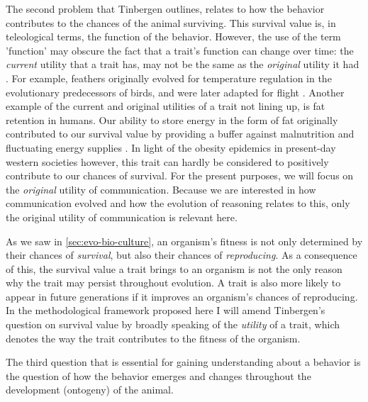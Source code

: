 The second problem that Tinbergen outlines, relates to how the behavior contributes to the chances of the animal surviving.
This survival value is, in teleological terms, the function of the behavior.  However, the use of the term 'function' may obscure the fact that a trait's function can change over time: the \emph{current} utility that a trait has, may not be the same as the \emph{original} utility it had \citep{BatesonLaland13}. For example, feathers originally evolved for temperature regulation in the evolutionary predecessors of birds, and were later adapted for flight \citep{Benton19, BatesonLaland13}.
Another example of the current and original utilities of a trait not lining up, is fat retention in humans. Our ability to store energy in the form of fat originally contributed to our survival value by providing a buffer against malnutrition and fluctuating energy supplies \citep{Wells06}. In light of the obesity epidemics in present-day western societies however, this trait can hardly be considered to positively contribute to our chances of survival.
For the present purposes, we will focus on the \emph{original} utility of communication. Because we are interested in how communication evolved and how the evolution of reasoning relates to this, only the original utility of communication is relevant here.

As we saw in \cref{sec:evo-bio-culture}, an organism's fitness is not only determined by their chances of \emph{survival}, but also their chances of \emph{reproducing}. As a consequence of this, the survival value a trait brings to an organism is not the only reason why the trait may persist throughout evolution. A trait is also more likely to appear in future generations if it improves an organism's chances of reproducing. In the methodological framework proposed here I will amend Tinbergen's question on survival value by broadly speaking of the \emph{utility} of a trait, which denotes the way the trait contributes to the fitness of the organism.

The third question that is essential for gaining understanding about a behavior is the question of how the behavior emerges and changes throughout the development (ontogeny) of the animal.

